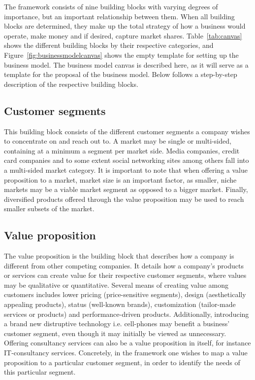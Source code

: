 The framework consists of nine building blocks with varying degrees of importance, but an important relationship between them. When all building blocks are determined, they make up the total strategy of how a business would operate, make money and if desired, capture market shares. Table~\ref{tab:canvas} shows the different building blocks by their respective categories, and Figure~\ref{fig:businessmodelcanvas} shows the empty template for setting up the business model. The business model canvas is described here, as it will serve as a template for the proposal of the business model. Below follows a step-by-step description of the respective building blocks.


\subsection{Customer segments}
This building block consists of the different customer segments a company wishes to concentrate on and reach out to. A market may be single or multi-sided, containing at a minimum a segment per market side. Media companies, credit card companies and to some extent social networking sites among others fall into a multi-sided market category. It is important to note that when offering a value proposition to a market, market size is an important factor, as smaller, niche markets may be a viable market segment as opposed to a bigger market. Finally, diversified products offered through the value proposition may be used to reach smaller subsets of the market.
\subsection{Value proposition}
The value proposition is the building block that describes how a company is different from other competing companies. It details how a company's products or services can create value for their respective customer segments, where values may be qualitative or quantitative. Several means of creating value among customers  includes lower pricing (price-sensitive segments), design (aesthetically appealing products), status (well-known brands), customization (tailor-made services or products) and performance-driven products. Additionally, introducing a brand new distruptive technology i.e. cell-phones may benefit a business' customer segment, even though it may initially be viewed as unnecessary. Offering consultancy services can also be a value proposition in itself, for instance IT-consultancy services. Concretely, in the framework one wishes to map a value proposition to a particular customer segment, in order to identify the needs of this particular segment.
